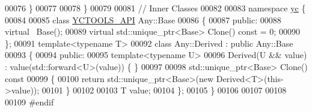 \begin{DoxyCode}
00076     \}
00077 
00078 \}
00079 
00081 \textcolor{comment}{// Inner Classes}
00082 
00083 \textcolor{keyword}{namespace }\hyperlink{namespaceyc}{yc} \{
00084     
00085     \textcolor{keyword}{class }\hyperlink{yctools_2_export_8h_aa9bd63af2d697c3f5d9ee84516c21762}{YCTOOLS\_API} Any::Base
00086     \{
00087         \textcolor{keyword}{public}:
00088         \textcolor{keyword}{virtual} ~Base();
00089         \textcolor{keyword}{virtual} std::unique\_ptr<Base> Clone() \textcolor{keyword}{const} = 0;
00090     \};
00091     \textcolor{keyword}{template}<\textcolor{keyword}{typename} T>
00092     \textcolor{keyword}{class }Any::Derived : \textcolor{keyword}{public} Any::Base
00093     \{
00094     \textcolor{keyword}{public}:
00095         \textcolor{keyword}{template}<\textcolor{keyword}{typename} U>
00096         Derived(U && value) : value(std::forward<U>(value)) \{ \}
00097         
00098         std::unique\_ptr<Base> Clone()\textcolor{keyword}{ const}
00099 \textcolor{keyword}{        }\{
00100             \textcolor{keywordflow}{return} std::unique\_ptr<Base>(\textcolor{keyword}{new} Derived<T>(this->value));
00101         \}
00102         
00103         T value;
00104     \};
00105 \}
00106 
00107 
00108 
00109 \textcolor{preprocessor}{#endif}
\end{DoxyCode}
